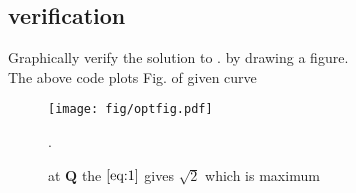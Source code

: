\documentclass[journal,10pt,twocolumn]{article}
\let\vec\mathbf
\let\vec\mathbf
\begin{document}
\subsection{verification} Graphically verify the solution to . 
by drawing a figure.
\\
The above code plots Fig. of given curve
%	

%
\begin{figure}[!ht]
\centering
\texttt{[image: fig/optfig.pdf]}
\caption{ at $\vec{Q}$ the $\eqref{eq:1}$ gives $\sqrt{2}$ which is maximum }.
\label{fig:qp_parab}
\end{figure}

\end{document}
